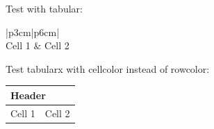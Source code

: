 ﻿\documentclass[10pt]{article}
\begin{document}
Test with tabular:
\begin{tabular}{|p{3cm}|p{6cm}|}
\hline
{} \\
\hline
Cell 1 & Cell 2 \\
\hline
\end{tabular}

\medskip
Test tabularx with cellcolor instead of rowcolor:
\begin{tabularx}{\linewidth}{|p{3cm}|X|}
\hline
\multicolumn{2}{|l|}{\cellcolor{navy}\color{white}\textbf{Header}} \\
\hline
Cell 1 & Cell 2 \\
\hline
\end{tabularx}
\end{document}
